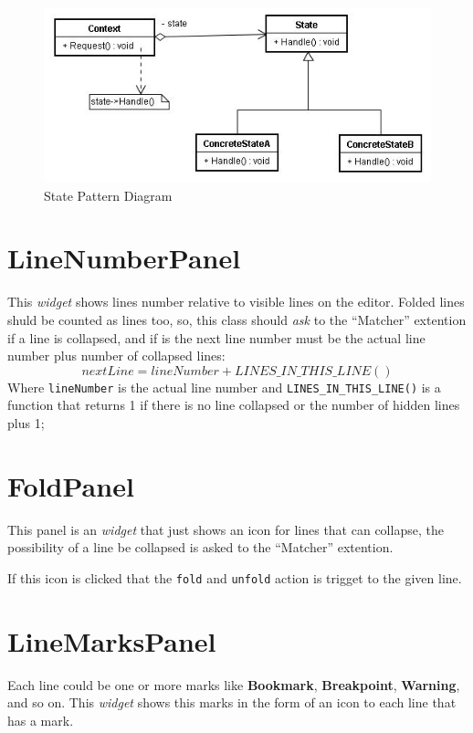 \documentclass[11pt,a4paper]{report}
\begin{document}
\begin{figure}[hbt]
\centering
\includegraphics{images/state_pattern.jpg}
\caption{State Pattern Diagram} \label{statePattern}
\end{figure}

\section{LineNumberPanel} \label{linenumberOverview}
This \textit{widget} shows lines number relative to visible lines on the editor. Folded lines shuld be counted as lines too, so, this class should \textit{ask} to the ``Matcher'' extention if a line is collapsed, and if is the next line number must be the actual line number plus number of collapsed lines:
\begin{displaymath}
nextLine = lineNumber + LINES\_IN\_THIS\_LINE()
\end{displaymath}
Where \texttt{lineNumber} is the actual line number and \texttt{LINES\_IN\_THIS\_LINE()} is a function that returns 1 if there is no line collapsed or the number of hidden lines plus 1;

\section{FoldPanel}
This panel is an \textit{widget} that just shows an icon for lines that can collapse, the possibility of a line be collapsed is asked to the ``Matcher'' extention. 

If this icon is clicked that the \texttt{fold} and \texttt{unfold} action is trigget to the given line.

\section{LineMarksPanel}
Each line could be one or more marks like \textbf{Bookmark}, \textbf{Breakpoint}, \textbf{Warning}, and so on.
This \textit{widget} shows this marks in the form of an icon to each line that has a mark.
\end{document}
